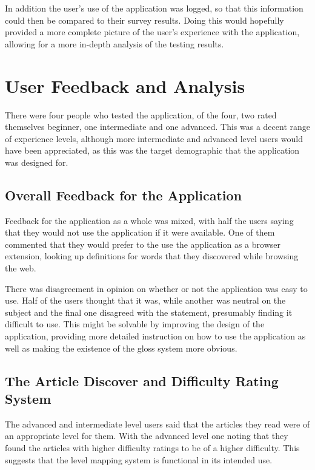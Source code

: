 In addition the user's use of the application was logged, so that this information could then be compared to their survey results. Doing this would hopefully provided a more complete picture of the user's experience with the application, allowing for a more in-depth analysis of the testing results. 

\section{User Feedback and Analysis}

There were four people who tested the application, of the four, two rated themselves beginner, one intermediate and one advanced. This was a decent range of experience levels, although more intermediate and advanced level users would have been appreciated, as this was the target demographic that the application was designed for.

\subsection{Overall Feedback for the Application}

Feedback for the application as a whole was mixed, with half the users saying that they would not use the application if it were available. One of them commented that they would prefer to the use the application as a browser extension, looking up definitions for words that they discovered while browsing the web.

There was disagreement in opinion on whether or not the application was easy to use. Half of the users thought that it was, while another was neutral on the subject and the final one disagreed with the statement, presumably finding it difficult to use. This might be solvable by improving the design of the application, providing more detailed instruction on how to use the application as well as making the existence of the gloss system more obvious.


\subsection{The Article Discover and Difficulty Rating System}

The advanced and intermediate level users said that the articles they read were of an appropriate level for them. With the advanced level one noting that they found the articles with higher difficulty ratings to be of a higher difficulty. This suggests that the level mapping system is functional in its intended use.  

